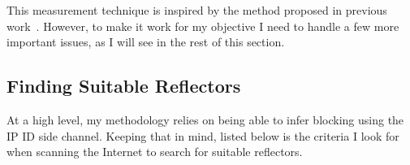 This measurement technique is inspired by the method proposed in previous
work~\cite{ensafi2014detecting, pearce2017augur}. However, to make it work 
for my objective I need to handle a few more important issues, as I will
see in the rest of this section.



\subsection{Finding Suitable Reflectors}
\label{sec:methrefl}

At a high level, my methodology relies on being able to infer blocking
using the IP ID side channel. Keeping that in mind, listed below is the
criteria I look for when scanning the Internet to search for suitable
reflectors.

